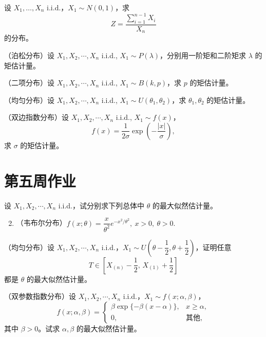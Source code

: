 \begin{homework}[2.4第3题]
设 \(X_1,\ldots,X_n\) i.i.d.，\(X_1\sim N(0,1)\)，求
\[
Z=\frac{\sum_{i=1}^{n-1}X_i}{X_n}
\]
的分布。
\end{homework}
\begin{homework}[1]
（泊松分布）设 \(X_1,X_2,\cdots,X_n\) i.i.d., \(X_1\sim P(\lambda)\)，分别用一阶矩和二阶矩求 \(\lambda\) 的矩估计量。
\end{homework}

\begin{homework}[2]
（二项分布）设 \(X_1,X_2,\cdots,X_n\) i.i.d., \(X_1\sim B(k,p)\)，求 \(p\) 的矩估计量。
\end{homework}

\begin{homework}[3]
（均匀分布）设 \(X_1,X_2,\cdots,X_n\) i.i.d., \(X_1\sim U(\theta_1,\theta_2)\)，求 \(\theta_1,\theta_2\) 的矩估计量。
\end{homework}



\begin{homework}[5]
（双边指数分布）设 \(X_1,X_2,\cdots,X_n\) i.i.d., \(X_1\sim f(x)\)，
\[
f(x)=\frac{1}{2\sigma}\exp\!\left(-\frac{|x|}{\sigma}\right),
\]
求 \(\sigma\) 的矩估计量。
\end{homework}
\section{第五周作业}
\begin{homework}[7]
设 \(X_1,X_2,\cdots,X_n\) i.i.d.，试分别求下列总体中 \(\theta\) 的最大似然估计量。

\begin{enumerate}
    \setcounter{enumi}{1}
    \item （韦布尔分布）\(f(x;\theta)=\dfrac{x}{\theta^2}e^{-x^2/\theta^2},\ x>0,\ \theta>0.\)
\end{enumerate}
\end{homework}

\begin{homework}[8]
（均匀分布）设 \(X_1,X_2,\cdots,X_n\) i.i.d.，\(X_1\sim U\left(\theta-\dfrac{1}{2},\theta+\dfrac{1}{2}\right)\)，证明任意
\[
T\in \left[X_{(n)}-\frac{1}{2},\,X_{(1)}+\frac{1}{2}\right]
\]
都是 \(\theta\) 的最大似然估计量。
\end{homework}
\begin{homework}[10]
（双参数指数分布）设 \(X_1,X_2,\cdots,X_n\) i.i.d.，\(X_1\sim f(x;\alpha,\beta)\)，
\[
f(x;\alpha,\beta)=
\begin{cases}
\beta \exp\{-\beta(x-\alpha)\}, & x\ge \alpha,\\
0, & \text{其他},
\end{cases}
\]
其中 \(\beta>0\)。试求 \(\alpha,\beta\) 的最大似然估计量。
\end{homework}

